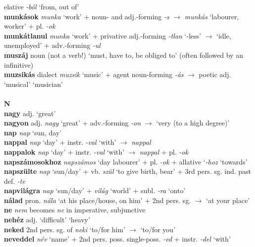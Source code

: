 \documentclass[11pt]{article}
\begin{document}
elative \emph{-ból} `from, out of' \\
\textbf{munkások} \emph{munka} `work' + noun\hyp{} and
adj.\hyp{}forming \emph{-s} $\rightarrow$ \emph{munkás} `labourer,
worker' + pl. \emph{-ok} \\
\textbf{munkátlanul} \emph{munka} `work' + privative
adj.\hyp{}forming \emph{-tlan} `-less' $\rightarrow$ `idle,
unemployed' + adv.\hyp{}forming \emph{-ul} \\
\textbf{muszáj} noun (not a verb!) `must, have to, be obliged to'
(often followed by an infinitive) \\
\textbf{muzsikás} dialect \emph{muzsik} `music' +  agent
noun\hyp{}forming \emph{-ás} $\rightarrow$
poetic adj. `musical' \textbar\textbar{} `musician' \\
\ \\
\noindent \textbf{\large N} \\
\textbf{nagy} adj. `great' \\
\textbf{nagyon} adj. \emph{nagy} `great' + adv.\hyp{}forming \emph{-on}
    $\rightarrow$ `very (to a high degree)' \\
\textbf{nap} \emph{nap} `sun, day' \\
\textbf{nappal} \emph{nap} `day' + instr. \emph{-val} `with'
$\rightarrow$ \emph{nappal} \\
\textbf{nappalok} \emph{nap} `day' + instr. \emph{-val}
  `with' $\rightarrow$ \emph{nappal} + pl. \emph{-ok} \\
\textbf{napszámosokhoz} \emph{napszámos} `day labourer' +
pl. \emph{-ok} + allative `\emph{-hoz} `towards' \\
\textbf{napszülte} \emph{nap} `sun/day' + vb. \emph{szül} `to give
birth, bear' + 3rd pers. sg. ind. past def. \emph{-te} \\
\textbf{napvilágra} \emph{nap} `sun/day' + \emph{világ}
  `world' + subl. \emph{-ra} `onto' \\
\textbf{nálad} pron. \emph{nála} `at his place/house, on him' + 2nd
pers. sg. $\rightarrow$ `at your place' \\
\textbf{ne} \emph{nem} becomes \emph{ne} in imperative, subjunctive \\
\textbf{nehéz} adj. `difficult' \textbar\textbar{} `heavy' \\
\textbf{neked} 2nd pers. sg. of \emph{neki} `to/for him'
$\rightarrow$ `to/for you' \\
\textbf{neveddel} \emph{név} `name' + 2nd
pers. poss. single\hyp{}poss. \emph{-ed} + instr. \emph{-del}
`with' \\
\end{document}
